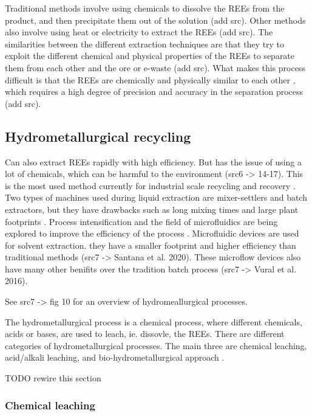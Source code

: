 Traditional methods involve using chemicals to dissolve the REEs from the product, and then precipitate them out of the solution (add src). Other methods also involve using heat or electricity to extract the REEs (add src). The similarities between the different extraction techniques are that they try to exploit the different chemical and physical properties of the REEs to separate them from each other and the ore or e-waste (add src). What makes this process difficult is that the REEs are chemically and physically similar to each other \cite{britannica2024}, which requires a high degree of precision and accuracy in the separation process (add src).

\subsection{Hydrometallurgical recycling}

Can also extract REEs rapidly with high efficiency. But has the issue of using a lot of chemicals, which can be harmful to the environment (src6 -> 14-17). This is the most used method currently for industrial scale recycling and recovery \cite{javed2024}. Two types of machines used during liquid extraction are mixer-settlers and batch extractors, but they have drawbacks such as long mixing times and large plant footprints \cite{javed2024}. Process intensification and the field of microfluidics are being explored to improve the efficiency of the process \cite{javed2024}. Microfluidic devices are used for solvent extraction. they have a smaller footprint and higher efficiency than traditional methods (src7 -> Santana et al. 2020). These microflow devices also have many other benifits over the tradition batch process (src7 -> Vural et al. 2016).

See src7 -> fig 10 for an overview of hydromeallurgical processes.

The hydrometallurgical process is a chemical process, where different chemicals, acids or bases, are used to leach, ie. dissovle, the REEs. There are different categories of hydrometallurgical processes. The main three are chemical leaching, acid/alkali leaching, and bio-hydrometallurgical approach \cite{javed2024}. 

TODO rewire this section

\subsubsection{Chemical leaching}

